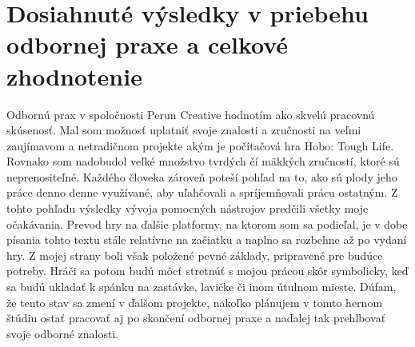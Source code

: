 \documentclass[slovak, bachelorpractice]{diploma}
\begin{document}
\section{Dosiahnuté výsledky v priebehu odbornej praxe a celkové zhodnotenie}
\label{sec:Results}
Odbornú prax v spoločnosti Perun Creative hodnotím ako skvelú pracovnú skúsenosť. Mal som možnosť uplatniť svoje znalosti a zručnosti na veľmi zaujímavom a netradičnom projekte akým je počítačová hra Hobo: Tough Life. Rovnako som nadobudol veľké množstvo tvrdých čí mäkkých zručností, ktoré sú neprenositeľné. Každého človeka zároveň poteší pohľad na to, ako sú plody jeho práce denno denne využívané, aby uľahčovali a spríjemňovali prácu ostatným. Z tohto pohľadu výsledky vývoja pomocných nástrojov predčili všetky moje očakávania. Prevod hry na ďalšie platformy, na ktorom som sa podieľal, je v dobe písania tohto textu stále relatívne na začiatku a naplno sa rozbehne až po vydaní hry. Z mojej strany boli však položené pevné základy, pripravené pre budúce potreby. 
Hráči sa potom budú môcť stretnúť s mojou prácou skôr symbolicky, keď sa budú ukladať k spánku na zastávke, lavičke či inom útulnom mieste. Dúfam, že tento stav sa zmení v ďalšom projekte, nakoľko plánujem v tomto hernom štúdiu ostať pracovať aj po skončení odbornej praxe a naďalej tak prehlbovať svoje odborné znalosti.

\printbibliography[title={Literatúra}, heading=bibintoc]
\end{document}
